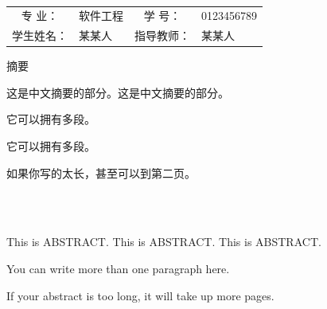 \documentclass[a4paper,AutoFakeBold,oneside,12pt]{book}
\begin{document}
\begin{titlepage}
\clearpage


\frontmatter
\setcounter{page}{1}

\clearpage
{}
{\centering
    \parbox[c]{.75\textwidth}{} \\

    \wuhao\vspace{7.7pt}   %
    \begin{tabular}{clcl} 
        专 \qquad 业：& 软件工程 &
        学 \qquad 号：& 0123456789 \\ 
        学生姓名：& 某某人 &
        指导教师：& 某某人
    \end{tabular}

    \abszhname 摘要 \\
}

\normalsize{
这是中文摘要的部分。这是中文摘要的部分。

它可以拥有多段。

它可以拥有多段。

如果你写的太长，甚至可以到第二页。
}
\par\noindent{}


\clearpage
{}
{\centering
    \parbox[c]{.75\textwidth}{} \\

    \vspace{.7pt} \\ 
}
\normalsize{
This is ABSTRACT. This is ABSTRACT. This is ABSTRACT.

You can write more than one paragraph here.

If your abstract is too long, it will take up more pages. 
}
\par\noindent{}
%

\clearpage
{}
\pagestyle{plain}
\tableofcontents

\end{titlepage}
\end{document}
